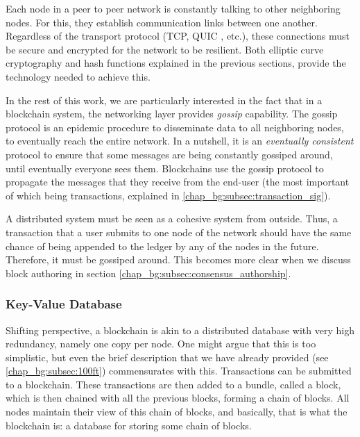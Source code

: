 Each node in a peer to peer network is constantly talking to other neighboring nodes. For this, they
establish communication links between one another. Regardless of the transport protocol (TCP, QUIC
\cite{carlucciHTTPUDPExperimental2015}, etc.), these connections must be secure and encrypted for
the network to be resilient. Both elliptic curve cryptography and hash functions explained in the
previous sections, provide the technology needed to achieve this.

In the rest of this work, we are particularly interested in the fact that in a blockchain system,
the networking layer provides \textit{gossip} capability. The gossip protocol is an epidemic
procedure to disseminate data to all neighboring nodes, to eventually reach the entire network. In a
nutshell, it is an \textit{eventually consistent} protocol to ensure that some messages are being
constantly gossiped around, until eventually everyone sees them. Blockchains use the gossip protocol
to propagate the messages that they receive from the end-user (the most important of which being
transactions, explained in \ref{chap_bg:subsec:transaction_sig}).

A distributed system must be seen as a cohesive system from outside. Thus, a transaction that a user
submits to one node of the network should have the same chance of being appended to the ledger by
any of the nodes in the future. Therefore, it must be gossiped around. This becomes more clear when
we discuss block authoring in section \ref{chap_bg:subsec:consensus_authorship}.

\subsubsection{Key-Value Database} \label{chap_bg:subsec:kvdb}

Shifting perspective, a blockchain is akin to a distributed database with very high redundancy,
namely one copy per node. One might argue that this is too simplistic, but even the brief
description that we have already provided (see \ref{chap_bg:subsec:100ft}) commensurates with this.
Transactions can be submitted to a blockchain. These transactions are then added to a bundle, called
a block, which is then chained with all the previous blocks, forming a chain of blocks. All nodes
maintain their view of this chain of blocks, and basically, that is what the blockchain is: a
database for storing some chain of blocks.

